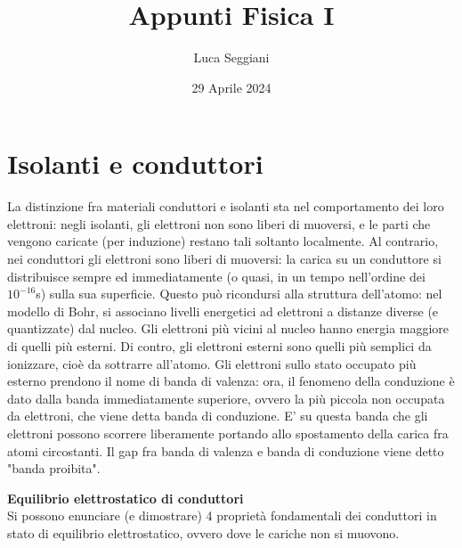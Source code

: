 \documentclass[a4paper,12pt]{article}
\title{Appunti Fisica I}
\author{Luca Seggiani}
\date{29 Aprile 2024}
\begin{document}
\maketitle
\section{Isolanti e conduttori}
La distinzione fra materiali conduttori e isolanti sta nel comportamento dei loro elettroni: negli isolanti, gli elettroni non sono liberi di muoversi, e le parti che vengono caricate (per induzione) restano tali soltanto localmente.
Al contrario, nei conduttori gli elettroni sono liberi di muoversi: la carica su un conduttore si distribuisce sempre ed immediatamente (o quasi, in un tempo nell'ordine dei $10^{-16}$s) sulla sua superficie. Questo può ricondursi alla struttura
dell'atomo: nel modello di Bohr, si associano livelli energetici ad elettroni a distanze diverse (e quantizzate) dal nucleo. Gli elettroni più vicini al nucleo hanno energia maggiore di quelli più esterni. Di contro, gli elettroni esterni
sono quelli più semplici da ionizzare, cioè da sottrarre all'atomo. Gli elettroni sullo stato occupato più esterno prendono il nome di banda di valenza: ora, il fenomeno della conduzione è dato dalla banda immediatamente superiore, ovvero
la più piccola non occupata da elettroni, che viene detta banda di conduzione. E' su questa banda che gli elettroni possono scorrere liberamente portando allo spostamento della carica fra atomi circostanti. 
Il gap fra banda di valenza e banda di conduzione viene detto "banda proibita".
\par\smallskip
\textbf{Equilibrio elettrostatico di conduttori} \\
Si possono enunciare (e dimostrare) 4 proprietà fondamentali dei conduttori in stato di equilibrio elettrostatico, ovvero dove le cariche non si muovono.
\end{document}
